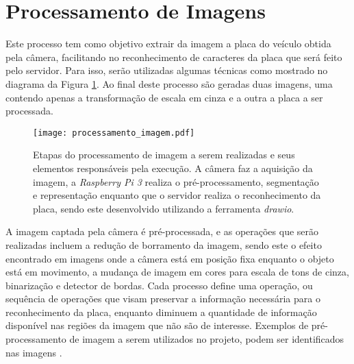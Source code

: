\section{Processamento de Imagens}
Este processo tem como objetivo extrair da imagem a placa do veículo obtida pela câmera, facilitando no reconhecimento de caracteres da placa que será feito pelo servidor. Para isso, serão utilizadas algumas técnicas como mostrado no diagrama da Figura \ref{processamento_imagem}. Ao final deste processo são geradas duas imagens, uma contendo apenas a transformação de escala em cinza e a outra a placa a ser processada.
\begin{figure}[H]
    \centering
    \texttt{[image: processamento\_imagem.pdf]}
    \caption{Etapas do processamento de imagem a serem realizadas e seus elementos responsáveis pela execução. A câmera faz a aquisição da imagem, a \emph{Raspberry Pi 3} realiza o pré-processamento, segmentação e representação enquanto que o servidor realiza o reconhecimento da placa, sendo este desenvolvido utilizando a ferramenta \emph{drawio}.} 
    \label{processamento_imagem}
\end{figure}
A imagem captada pela câmera é pré-processada, e as operações que serão realizadas incluem a redução de borramento da imagem, sendo este o efeito encontrado em imagens onde a câmera está em posição fixa enquanto o objeto está em movimento, a mudança de imagem em cores para escala de tons de cinza, binarização e detector de bordas. Cada processo define uma operação, ou sequência de operações que visam preservar a informação necessária para o reconhecimento da placa, enquanto diminuem a quantidade de informação disponível nas regiões da imagem que não são de interesse.
Exemplos de pré-processamento de imagem a serem utilizados no projeto, podem ser identificados nas imagens \cite{gonzalez}.
